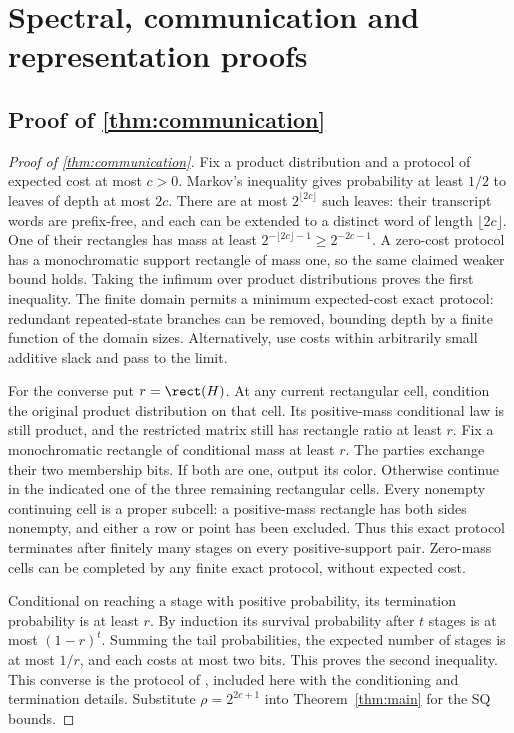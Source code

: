 \section{Spectral, communication and representation proofs}\label{app:proofs-E}

\subsection[Proof of result communication]{Proof of \cref{thm:communication}}\label{proof:communication}
\begin{proof}[Proof of \cref{thm:communication}]
Fix a product distribution and a protocol of expected cost at most $c>0$. Markov's inequality gives probability at least $1/2$ to leaves of depth at most $2c$. There are at most $2^{\lfloor2c\rfloor}$ such leaves: their transcript words are prefix-free, and each can be extended to a distinct word of length $\lfloor2c\rfloor$. One of their rectangles has mass at least $2^{-\lfloor2c\rfloor-1}\ge2^{-2c-1}$. A zero-cost protocol has a monochromatic support rectangle of mass one, so the same claimed weaker bound holds. Taking the infimum over product distributions proves the first inequality. The finite domain permits a minimum expected-cost exact protocol: redundant repeated-state branches can be removed, bounding depth by a finite function of the domain sizes. Alternatively, use costs within arbitrarily small additive slack and pass to the limit.

For the converse put $r=\rect(H)$. At any current rectangular cell, condition the original product distribution on that cell. Its positive-mass conditional law is still product, and the restricted matrix still has rectangle ratio at least $r$. Fix a monochromatic rectangle of conditional mass at least $r$. The parties exchange their two membership bits. If both are one, output its color. Otherwise continue in the indicated one of the three remaining rectangular cells. Every nonempty continuing cell is a proper subcell: a positive-mass rectangle has both sides nonempty, and either a row or point has been excluded. Thus this exact protocol terminates after finitely many stages on every positive-support pair. Zero-mass cells can be completed by any finite exact protocol, without expected cost.

Conditional on reaching a stage with positive probability, its termination probability is at least $r$. By induction its survival probability after $t$ stages is at most $(1-r)^t$. Summing the tail probabilities, the expected number of stages is at most $1/r$, and each costs at most two bits. This proves the second inequality. This converse is the protocol of \citet[Proposition~3.14]{HHPTZ22}, included here with the conditioning and termination details. Substitute $\rho=2^{2c+1}$ into Theorem~\ref{thm:main} for the SQ bounds.
\end{proof}

